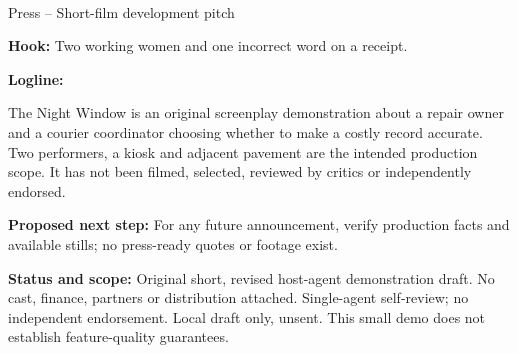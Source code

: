 \documentclass[11pt,letterpaper]{article}
\begin{document}
\begin{center}
{\Large\bfseries\sffamily \filmtitleupper}\\[6pt]
Press -- Short-film development pitch
\end{center}
\textbf{Hook:} Two working women and one incorrect word on a receipt.

\textbf{Logline:} \filmlogline

The Night Window is an original screenplay demonstration about a repair owner and a courier coordinator choosing whether to make a costly record accurate. Two performers, a kiosk and adjacent pavement are the intended production scope. It has not been filmed, selected, reviewed by critics or independently endorsed.

\textbf{Proposed next step:} For any future announcement, verify production facts and available stills; no press-ready quotes or footage exist.

\textbf{Status and scope:} Original short, revised host-agent demonstration draft. No cast, finance, partners or distribution attached. Single-agent self-review; no independent endorsement. Local draft only, unsent. This small demo does not establish feature-quality guarantees.
\end{document}
